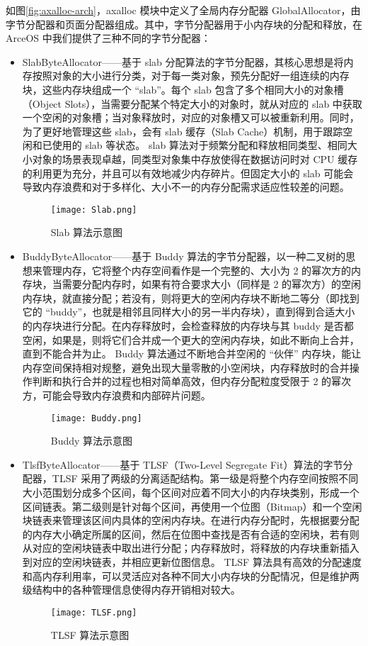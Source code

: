 如图\ref{fig:axalloc-arch}，axalloc 模块中定义了全局内存分配器 GlobalAllocator，由字节分配器和页面分配器组成。其中，字节分配器用于小内存块的分配和释放，在 ArceOS 中我们提供了三种不同的字节分配器：
\begin{itemize}
\item SlabByteAllocator——基于 slab 分配算法的字节分配器，其核心思想是将内存按照对象的大小进行分类，对于每一类对象，预先分配好一组连续的内存块，这些内存块组成一个 “slab”。每个 slab 包含了多个相同大小的对象槽（Object Slots），当需要分配某个特定大小的对象时，就从对应的 slab 中获取一个空闲的对象槽；当对象释放时，对应的对象槽又可以被重新利用。同时，为了更好地管理这些 slab，会有 slab 缓存（Slab Cache）机制，用于跟踪空闲和已使用的 slab 等状态。
slab 算法对于频繁分配和释放相同类型、相同大小对象的场景表现卓越，同类型对象集中存放使得在数据访问时对 CPU 缓存的利用更为充分，并且可以有效地减少内存碎片。但固定大小的 slab 可能会导致内存浪费和对于多样化、大小不一的内存分配需求适应性较差的问题。
\begin{figure}
  \centering
  \texttt{[image: Slab.png]}
  \caption{Slab 算法示意图}
  \label{fig:Slab}
\end{figure}
\item BuddyByteAllocator——基于 Buddy 算法的字节分配器，以一种二叉树的思想来管理内存，它将整个内存空间看作是一个完整的、大小为 2 的幂次方的内存块，当需要分配内存时，如果有符合要求大小（同样是 2 的幂次方）的空闲内存块，就直接分配；若没有，则将更大的空闲内存块不断地二等分（即找到它的 “buddy”，也就是相邻且同样大小的另一半内存块），直到得到合适大小的内存块进行分配。在内存释放时，会检查释放的内存块与其 buddy 是否都空闲，如果是，则将它们合并成一个更大的空闲内存块，如此不断向上合并，直到不能合并为止。
Buddy 算法通过不断地合并空闲的 “伙伴” 内存块，能让内存空间保持相对规整，避免出现大量零散的小空闲块，内存释放时的合并操作判断和执行合并的过程也相对简单高效，但内存分配粒度受限于 2 的幂次方，可能会导致内存浪费和内部碎片问题。
\begin{figure}[H]
  \centering
  \texttt{[image: Buddy.png]}
  \caption{Buddy 算法示意图}
  \label{fig:Buddy}
\end{figure}
\item TlsfByteAllocator——基于 TLSF（Two-Level Segregate Fit）算法的字节分配器，TLSF 采用了两级的分离适配结构。第一级是将整个内存空间按照不同大小范围划分成多个区间，每个区间对应着不同大小的内存块类别，形成一个区间链表。第二级则是针对每个区间，再使用一个位图（Bitmap）和一个空闲块链表来管理该区间内具体的空闲内存块。在进行内存分配时，先根据要分配的内存大小确定所属的区间，然后在位图中查找是否有合适的空闲块，若有则从对应的空闲块链表中取出进行分配；内存释放时，将释放的内存块重新插入到对应的空闲块链表，并相应更新位图信息。
TLSF 算法具有高效的分配速度和高内存利用率，可以灵活应对各种不同大小内存块的分配情况，但是维护两级结构中的各种管理信息使得内存开销相对较大。
\begin{figure}[H]
  \centering
  \texttt{[image: TLSF.png]}
  \caption{TLSF 算法示意图}
  \label{fig:TLSF}
\end{figure}
\end{itemize}

